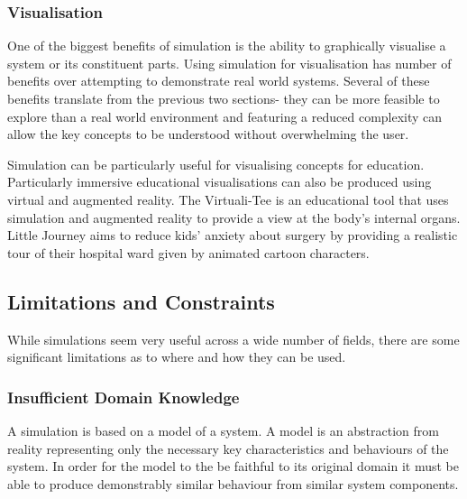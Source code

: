 \documentclass{UoYCSproject}
\begin{document}

\subsubsection{Visualisation}
\label{visualisation}
One of the biggest benefits of simulation is the ability to graphically visualise a system or its constituent parts.
Using simulation for visualisation has number of benefits over attempting to demonstrate real world systems.
Several of these benefits translate from the previous two sections- they can be more feasible to explore than a real world environment and featuring a reduced complexity can allow the key concepts to be understood without overwhelming the user.

Simulation can be particularly useful for visualising concepts for education. 
Particularly immersive educational visualisations can also be produced using virtual and augmented reality.
The Virtuali-Tee is an educational tool that uses simulation and augmented reality to provide a view at the body's internal organs\cite{curiscope}.
Little Journey aims to reduce kids' anxiety about surgery by providing a realistic tour of their hospital ward given by animated cartoon characters\cite{little_journey}.



\subsection{Limitations and Constraints}
While simulations seem very useful across a wide number of fields, there are some significant limitations as to where and how they can be used.

\subsubsection{Insufficient Domain Knowledge}
\label{domain_knowledge}
A simulation is based on a model of a system.
A model is an abstraction from reality representing only the necessary key characteristics and behaviours of the system.
In order for the model to the be faithful to its original domain it must be able to produce demonstrably similar behaviour from similar system components.
\end{document}
